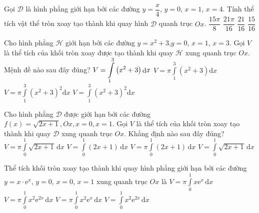 \begin{ex}%
Gọi $\mathscr{D}$ là hình phẳng giới hạn bởi các đường $y=\dfrac{x}{4}$, $y=0$, $x=1$, $x=4$. Tính thể tích vật thể tròn xoay tạo thành khi quay hình $\mathscr{D}$ quanh trục $Ox$.
\choice
{$\dfrac{15\pi}{8}$}
{\True $\dfrac{21\pi}{16}$}
{$\dfrac{21}{16}$}
{$\dfrac{15}{16}$}
\end{ex}

\begin{ex}%
Cho hình phẳng $\mathscr{H}$ giới hạn bởi các đường $y=x^2+3$,$y=0$, $x=1$, $x=3$. Gọi $V$ là thể tích của khối tròn xoay được tạo thành khi quay $\mathscr{H}$ xung quanh trục $Ox$. Mệnh đề nào sau đây đúng?
\choice
{$V=\displaystyle\int\limits_1^3\left(x^2+3\right){\mathop{\rm d}\nolimits}x$}
{$V=\pi\displaystyle\int\limits_1^3\left(x^2+3\right){\mathrm{d}}x$}
{\True $V=\pi\displaystyle\int\limits_1^3\left(x^2+3\right)^2\mathrm{d}x$}
{$V=\displaystyle\int\limits_1^3\left(x^2+3\right)^2\mathrm{d}x$}
\end{ex}

\begin{ex}%
Cho hình phẳng $\mathscr{D}$ được giới hạn bởi các đường $f(x)=\sqrt{2x+1}, Ox, x=0, x=1$. Gọi  $V$ là thể tích của khối tròn xoay tạo thành khi quay $\mathscr{D}$ xung quanh trục $Ox$. Khẳng định nào sau đây đúng? 
\choice
{$V=\pi\displaystyle\int\limits_0^1\sqrt{2x+1}\mathrm{\,d}x$}
{$V=\displaystyle\int\limits_0^1\left(2x+1\right)\mathrm{\,d}x$}
{\True $V=\pi\displaystyle\int\limits_0^1\left(2x+1\right)\mathrm{\,d}x$}
{$V=\displaystyle\int\limits_0^1\sqrt{2x+1}\mathrm{\,d}x$}
\end{ex}

\begin{ex}%
Thể tích khối tròn xoay tạo thành khi quay hình phẳng giới hạn bởi các đường $y=x\cdot\mathrm{e}^x$, $y=0$, $x=0$, $x=1$ xung quanh trục $Ox$ là
\choice
{$V=\pi\displaystyle\int\limits_0^1 x\mathrm{e}^{x}\mathrm{\, d}x$}
{\True $V=\pi\displaystyle\int\limits_0^1x^2\mathrm{e}^{2x}\mathrm{\, d}x$}
{$V=\pi\displaystyle\int\limits_0^1x^2\mathrm{e}^x\mathrm{\, d}x$}
{$V=\displaystyle\int\limits_0^1x^2\mathrm{e}^{2x}\mathrm{\, d}x$}
\end{ex}

